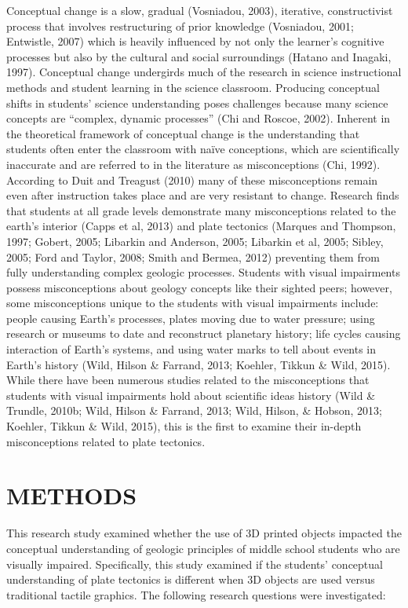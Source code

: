 \documentclass[11.5pt]{sig-alternate} %
\begin{document}
\begin{large}
Conceptual change is a slow, gradual (Vosniadou, 2003), iterative, constructivist process that involves restructuring of prior knowledge (Vosniadou, 2001; Entwistle, 2007) which is heavily influenced by not only the learner’s cognitive processes but also by the cultural and social surroundings (Hatano and Inagaki, 1997).  Conceptual change undergirds much of the research in science instructional methods and student learning in the science classroom.  Producing conceptual shifts in students’ science understanding poses challenges because many science concepts are “complex, dynamic processes” (Chi and Roscoe, 2002).  Inherent in the theoretical framework of conceptual change is the understanding that students often enter the classroom with naïve conceptions, which are scientifically inaccurate and are referred to in the literature as misconceptions (Chi, 1992).  According to Duit and Treagust (2010) many of these misconceptions remain even after instruction takes place and are very resistant to change.  Research finds that students at all grade levels demonstrate many misconceptions related to the earth's interior (Capps et al, 2013) and plate tectonics (Marques and Thompson, 1997; Gobert, 2005; Libarkin and Anderson, 2005; Libarkin et al, 2005; Sibley, 2005; Ford and Taylor, 2008; Smith and Bermea, 2012) preventing them from fully understanding complex geologic processes.  Students with visual impairments possess misconceptions about geology concepts like their sighted peers; however, some misconceptions unique to the students with visual impairments include: people causing Earth’s processes, plates moving due to water pressure; using research or museums to date and reconstruct planetary history; life cycles causing interaction of Earth’s systems, and using water marks to tell about events in Earth’s history (Wild, Hilson \& Farrand, 2013; Koehler, Tikkun \& Wild, 2015).  While there have been numerous studies related to the misconceptions that students with visual impairments hold about scientific ideas history (Wild \& Trundle, 2010b; Wild, Hilson \& Farrand, 2013; Wild, Hilson, \& Hobson, 2013; Koehler, Tikkun \& Wild, 2015), this is the first to examine their in-depth misconceptions related to plate tectonics.  

\section*{METHODS}

This research study examined whether the use of 3D printed objects impacted the conceptual understanding of geologic principles of middle school students who are visually impaired.  Specifically, this study examined if the students’ conceptual understanding of plate tectonics is different when 3D objects are used versus traditional tactile graphics.  The following research questions were investigated:  


\end{large}
\end{document}
